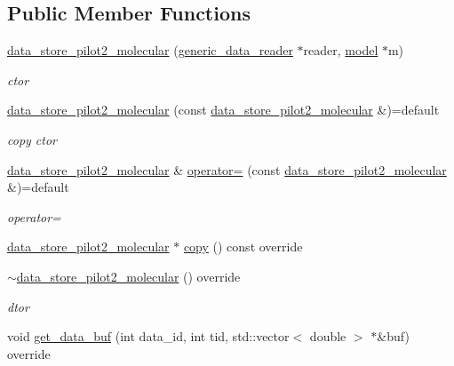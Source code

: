 \subsection*{Public Member Functions}
\begin{DoxyCompactItemize}
\item 
\hyperlink{classlbann_1_1data__store__pilot2__molecular_a125dd5e8628bb97608bd8e4a7b7428ef}{data\+\_\+store\+\_\+pilot2\+\_\+molecular} (\hyperlink{classlbann_1_1generic__data__reader}{generic\+\_\+data\+\_\+reader} $\ast$reader, \hyperlink{classlbann_1_1model}{model} $\ast$m)
\begin{DoxyCompactList}\small\item\em ctor \end{DoxyCompactList}\item 
\hyperlink{classlbann_1_1data__store__pilot2__molecular_a00cabec3193c88d5317da61b8277587f}{data\+\_\+store\+\_\+pilot2\+\_\+molecular} (const \hyperlink{classlbann_1_1data__store__pilot2__molecular}{data\+\_\+store\+\_\+pilot2\+\_\+molecular} \&)=default
\begin{DoxyCompactList}\small\item\em copy ctor \end{DoxyCompactList}\item 
\hyperlink{classlbann_1_1data__store__pilot2__molecular}{data\+\_\+store\+\_\+pilot2\+\_\+molecular} \& \hyperlink{classlbann_1_1data__store__pilot2__molecular_a83dafc1e48b19b5d90f5618f64bfd158}{operator=} (const \hyperlink{classlbann_1_1data__store__pilot2__molecular}{data\+\_\+store\+\_\+pilot2\+\_\+molecular} \&)=default
\begin{DoxyCompactList}\small\item\em operator= \end{DoxyCompactList}\item 
\hyperlink{classlbann_1_1data__store__pilot2__molecular}{data\+\_\+store\+\_\+pilot2\+\_\+molecular} $\ast$ \hyperlink{classlbann_1_1data__store__pilot2__molecular_a1a59e48a8c7ca8efe86509e0d9cd1307}{copy} () const override
\item 
\hyperlink{classlbann_1_1data__store__pilot2__molecular_a73f7d920f8f8174af4c2cec984fee7e6}{$\sim$data\+\_\+store\+\_\+pilot2\+\_\+molecular} () override
\begin{DoxyCompactList}\small\item\em dtor \end{DoxyCompactList}\item 
void \hyperlink{classlbann_1_1data__store__pilot2__molecular_ab0f82fb7fdec7779bbb693e06a206127}{get\+\_\+data\+\_\+buf} (int data\+\_\+id, int tid, std\+::vector$<$ double $>$ $\ast$\&buf) override

\end{DoxyCompactItemize}
